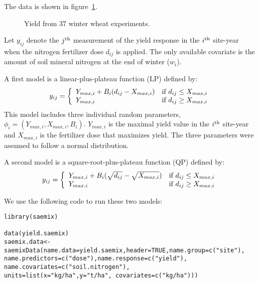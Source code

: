 {The data is shown in figure~\ref{fig:yielddata}.
\begin{figure}[!h]
\begin{center}
\par \kern -1cm
\end{center}
\par \kern -0.5cm
\caption{Yield from 37 winter wheat experiments.} \label{fig:yielddata}
\end{figure}

Let $y_{ij}$ denote the $j^{\rm th}$ measurement of the yield response in the $i^{\rm th}$ site-year when the nitrogen fertilizer dose $d_{ij}$ is applied. The only available covariate is the amount of soil mineral nitrogen at the end of winter ($w_ i$).

A first model is a linear-plus-plateau function (LP) defined by:
\begin{equation}
y_{ij} = \left\{ \begin{array}{l r}
Y_{max,i} + B_i (d_{ij} - X_{max,i}) & \text{if } d_{ij} \leq X_{max,i} \\
Y_{max,i}  & \text{if } d_{ij} \geq X_{max,i} \\
         \end{array}
\right.
\end{equation}
This model includes three individual random parameters, $\phi_i = \left( Y_{max,i}, X_{max,i}, B_i \right)$. $Y_{max,i}$ is the maximal yield value in the $i^{\rm th}$ site-year and $X_{max,i}$ is the fertilizer dose that maximizes yield. The three parameters were assumed to follow a normal distribution.

A second model is a square-root-plus-plateau function (QP) defined by:
\begin{equation}
y_{ij} = \left\{ \begin{array}{l r}
Y_{max,i} + B_i (\sqrt{d_{ij}} - \sqrt{X_{max,i}}) & \text{if } d_{ij} \leq X_{max,i} \\
Y_{max,i}  & \text{if } d_{ij} \geq X_{max,i} \\
         \end{array}
\right.
\end{equation}

We use the following code to run these two models:
\begin{verbatim}
library(saemix)

data(yield.saemix)
saemix.data<-saemixData(name.data=yield.saemix,header=TRUE,name.group=c("site"), 
name.predictors=c("dose"),name.response=c("yield"), name.covariates=c("soil.nitrogen"), 
units=list(x="kg/ha",y="t/ha", covariates=c("kg/ha")))


\end{verbatim}}
